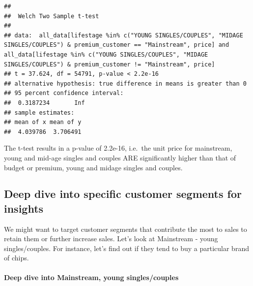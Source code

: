 \documentclass[
]{article}
\newenvironment{Shaded}{\begin{snugshade}}{\end{snugshade}}
\newcommand{\NormalTok}[1]{#1}
\newcommand{\OtherTok}[1]{\textcolor[rgb]{0.56,0.35,0.01}{#1}}
\newcommand{\SpecialCharTok}[1]{\textcolor[rgb]{0.81,0.36,0.00}{\textbf{#1}}}
\newcommand{\StringTok}[1]{\textcolor[rgb]{0.31,0.60,0.02}{#1}}
\begin{document}
\begin{verbatim}
## 
##  Welch Two Sample t-test
## 
## data:  all_data[lifestage %in% c("YOUNG SINGLES/COUPLES", "MIDAGE SINGLES/COUPLES") & premium_customer == "Mainstream", price] and all_data[lifestage %in% c("YOUNG SINGLES/COUPLES", "MIDAGE SINGLES/COUPLES") & premium_customer != "Mainstream", price]
## t = 37.624, df = 54791, p-value < 2.2e-16
## alternative hypothesis: true difference in means is greater than 0
## 95 percent confidence interval:
##  0.3187234       Inf
## sample estimates:
## mean of x mean of y 
##  4.039786  3.706491
\end{verbatim}

The t-test results in a p-value of 2.2e-16, i.e.~the unit price for
mainstream, young and mid-age singles and couples ARE significantly
higher than that of budget or premium, young and midage singles and
couples.

\hypertarget{deep-dive-into-specific-customer-segments-for-insights}{%
\subsection{Deep dive into specific customer segments for
insights}\label{deep-dive-into-specific-customer-segments-for-insights}}

We might want to target customer segments that contribute the most to
sales to retain them or further increase sales. Let's look at Mainstream
- young singles/couples. For instance, let's find out if they tend to
buy a particular brand of chips.

\hypertarget{deep-dive-into-mainstream-young-singlescouples}{%
\paragraph{Deep dive into Mainstream, young
singles/couples}\label{deep-dive-into-mainstream-young-singlescouples}}

\begin{Shaded}
\end{Shaded}
\end{document}

